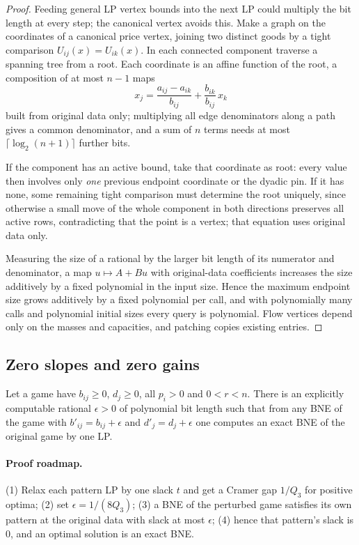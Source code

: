 \begin{proof}
Feeding general LP vertex bounds into the next LP could multiply the bit length at every step; the
canonical vertex avoids this. Make a graph on the coordinates of a canonical price vertex, joining two
distinct goods by a tight comparison $U_{ij}(x)=U_{ik}(x)$. In each connected component traverse a
spanning tree from a root. Each coordinate is an affine function of the root, a composition of at most
$n-1$ maps
\[
x_j=\frac{a_{ij}-a_{ik}}{b_{ij}}+\frac{b_{ik}}{b_{ij}}\,x_k
\]
built from original data only; multiplying all edge denominators along a path gives a common
denominator, and a sum of $n$ terms needs at most $\lceil\log_2(n+1)\rceil$ further bits.

If the
component has an active bound, take that coordinate as root: every value then involves only \emph{one}
previous endpoint coordinate or the dyadic pin. If it has none, some remaining tight comparison must
determine the root uniquely, since otherwise a small move of the whole component in both directions
preserves all active rows, contradicting that the point is a vertex; that equation uses original data
only.

Measuring the size of a rational by the larger bit length of its numerator and denominator, a map
$u\mapsto A+Bu$ with original-data coefficients increases the size additively by a fixed polynomial in
the input size. Hence the maximum endpoint size grows additively by a fixed polynomial per call, and
with polynomially many calls and polynomial initial sizes every query is polynomial. Flow vertices
depend only on the masses and capacities, and patching copies existing entries.
\end{proof}

\subsection{Zero slopes and zero gains}\label{sec:mk-degenerate}

\begin{lemma}\label{lem:mk-degenerate}
Let a game have $b_{ij}\ge0$, $d_j\ge0$, all $p_i>0$ and $0<r<n$. There is an explicitly computable
rational $\epsilon>0$ of polynomial bit length such that from any BNE of the game with
$b'_{ij}=b_{ij}+\epsilon$ and $d'_j=d_j+\epsilon$ one computes an exact BNE of the original game by one LP.
\end{lemma}

\paragraph{Proof roadmap.} (1) Relax each pattern LP by one slack $t$ and get a Cramer gap $1/Q_3$ for
positive optima; (2) set $\epsilon=1/(8Q_3)$; (3) a BNE of the perturbed game satisfies its own pattern
at the original data with slack at most $\epsilon$; (4) hence that pattern's slack is $0$, and an optimal
solution is an exact BNE.

